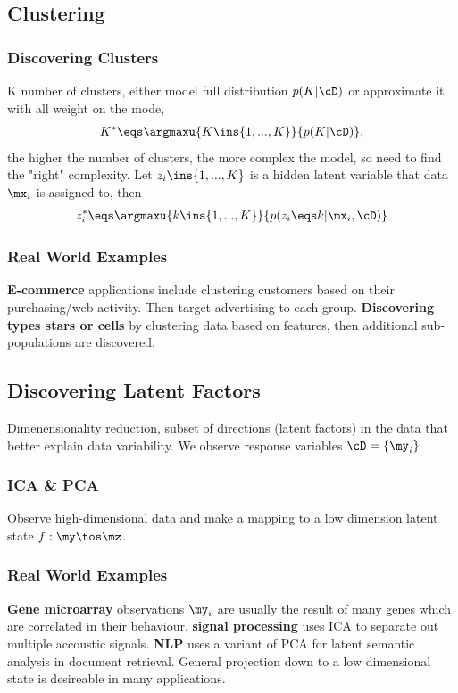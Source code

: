 \documentclass[11pt,a4paper]{report}
\begin{document}
\subsection{Clustering}
\subsubsection{Discovering Clusters}
K number of clusters, either model full distribution $p(K|\cD)$ or approximate it with all weight on the mode,
\begin{align}
	K^{*}\eqs\argmaxu{K\ins\{1,...,K\}}{p(K|\cD)},
\end{align}
the higher the number of clusters, the more complex the model, so need to find the "right" complexity. Let $z_{i}\ins\{1,...,K\}$ is a hidden latent variable that data $\mx_{i}$ is assigned to, then
\begin{align}
	z_{i}^{*}\eqs \argmaxu{k\ins\{1,...,K\}}{p(z_{i}\eqs k|\mx_{i},\cD)}
\end{align}

\subsubsection{Real World Examples}

{\bf E-commerce} applications include clustering customers based on their purchasing/web activity. Then target advertising to each group.
{\bf Discovering types stars or cells} by clustering data based on features, then additional sub-populations are discovered.

\subsection{Discovering Latent Factors}
Dimenensionality reduction, subset of directions (latent factors) in the data that better explain data variability. We observe response variables $\cD=\{\my_{i}\}$

\subsubsection{ICA \& PCA}
Observe high-dimensional data and make a mapping to a low dimension latent state $f:\my\tos\mz$.

\subsubsection{Real World Examples}
{\bf Gene microarray} observations $\my_{i}$ are usually the result of many genes which are correlated in their behaviour. {\bf signal processing} uses ICA to separate out multiple accoustic signals. {\bf NLP} uses a variant of PCA for latent semantic analysis in document retrieval. General projection down to a low dimensional state is desireable in many applications.
\end{document}
